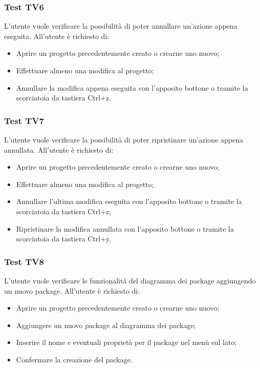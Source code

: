 \documentclass[../PianoDiQualifica.tex]{subfiles}
\begin{document}
	
	\subsubsection{Test TV6}
	L'utente vuole verificare la possibilità di poter annullare un'azione appena eseguita. 
	All'utente è richiesto di: 
	\begin{itemize} 
		\item Aprire un progetto precedentemente creato o crearne uno nuovo; 
		\item Effettuare almeno una modifica al progetto; 
		\item Annullare la modifica appena eseguita con l'apposito bottone o tramite la scorciatoia da tastiera Ctrl+z. 
	\end{itemize}    
	
	\subsubsection{Test TV7} 
	L'utente vuole verificare la possibilità di poter ripristinare un'azione appena annullata. 
	All'utente è richiesto di: 
	\begin{itemize} 
		\item Aprire un progetto precedentemente creato o crearne uno nuovo; 
		\item Effettuare almeno una modifica al progetto; 
		\item Annullare l'ultima modifica eseguita con l'apposito bottone o tramite la scorciatoia da tastiera Ctrl+z; 
		\item Ripristinare la modifica annullata con l'apposito bottone o tramite la scorciatoia da tastiera Ctrl+y. 
	\end{itemize}    
	
	
	
	
	\subsubsection{Test TV8} 
	L'utente vuole verificare le funzionalità del diagramma dei package aggiungendo un nuovo package. 
	All'utente è richiesto di: 
	\begin{itemize} 
		\item Aprire un progetto precedentemente creato o crearne uno nuovo; 
		\item Aggiungere un nuovo package al diagramma dei package; 
		\item Inserire il nome e eventuali proprietà per il package nel menù sul lato; %
		\item Confermare la creazione del package. 
	\end{itemize} 
	
\end{document}
